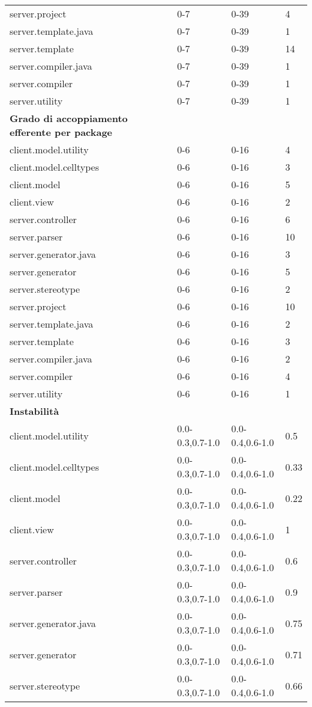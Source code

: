 \begin{longtable}{|p{5.5cm}|p{2.25cm}|p{2.25cm}|p{2.25cm}|}
		server.project  &0-7 &0-39 &4\\
		server.template.java  &0-7 &0-39 &1\\
		server.template  &0-7 &0-39 &14\\
		server.compiler.java  &0-7 &0-39 &1\\
		server.compiler  &0-7 &0-39 &1\\
		server.utility  &0-7 &0-39 &1\\
		\hline
		\textbf{Grado di accoppiamento efferente per package} & & &\\
		client.model.utility &0-6 &0-16 &4\\
		client.model.celltypes &0-6 &0-16 &3\\
		client.model &0-6 &0-16 &5\\
		client.view &0-6 &0-16 &2\\
		server.controller &0-6 &0-16 &6\\
		server.parser &0-6 &0-16 &10\\
		server.generator.java &0-6 &0-16 &3\\
		server.generator &0-6 &0-16 &5\\
		server.stereotype &0-6 &0-16 &2\\
		server.project &0-6 &0-16 &10\\
		server.template.java &0-6 &0-16 &2\\
		server.template &0-6 &0-16 &3\\
		server.compiler.java &0-6 &0-16 &2\\
		server.compiler &0-6 &0-16 &4\\
		server.utility &0-6 &0-16 &1\\
		\hline
		\textbf{Instabilità} & & &\\
		client.model.utility &0.0-0.3,0.7-1.0 &0.0-0.4,0.6-1.0 &0.5\\
		client.model.celltypes &0.0-0.3,0.7-1.0 &0.0-0.4,0.6-1.0 &0.33\\
		client.model &0.0-0.3,0.7-1.0 &0.0-0.4,0.6-1.0 &0.22\\
		client.view &0.0-0.3,0.7-1.0 &0.0-0.4,0.6-1.0 &1\\
		server.controller &0.0-0.3,0.7-1.0 &0.0-0.4,0.6-1.0 &0.6\\
		server.parser &0.0-0.3,0.7-1.0 &0.0-0.4,0.6-1.0 &0.9\\
		server.generator.java &0.0-0.3,0.7-1.0 &0.0-0.4,0.6-1.0 &0.75\\
		server.generator &0.0-0.3,0.7-1.0 &0.0-0.4,0.6-1.0 &0.71\\
		server.stereotype &0.0-0.3,0.7-1.0 &0.0-0.4,0.6-1.0 &0.66\\

\end{longtable}
